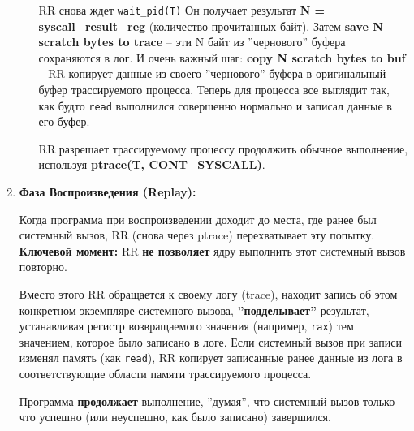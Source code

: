 \begin{enumerate}
\begin{itemize}
      RR снова ждет \texttt{wait\_pid(T)} Он получает результат \textbf{N =
      syscall\_result\_reg} (количество прочитанных байт). Затем \textbf{save N scratch
      bytes to trace} – эти N байт из ''чернового'' буфера сохраняются в лог. И
      очень важный шаг: \textbf{copy N scratch bytes to buf} – RR копирует данные из
      своего ''чернового'' буфера в оригинальный буфер трассируемого процесса.
      Теперь для процесса все выглядит так, как будто \texttt{read} выполнился
      совершенно нормально и записал данные в его буфер.

      RR разрешает трассируемому процессу продолжить обычное выполнение,
      используя \textbf{ptrace(T, CONT\_SYSCALL)}.

    \end{itemize}

  \item \textbf{Фаза Воспроизведения (Replay):}

  Когда программа при воспроизведении доходит до места, где ранее был системный
  вызов, RR (снова через ptrace) перехватывает эту попытку. \textbf{Ключевой
  момент:} RR \textbf{не позволяет} ядру выполнить этот системный вызов
  повторно. 
  
  Вместо этого RR обращается к своему логу (trace), находит запись об этом
  конкретном экземпляре системного вызова, \textbf{''подделывает''} результат,
  устанавливая регистр возвращаемого значения (например, \texttt{rax}) тем
  значением, которое было записано в логе. Если системный вызов при записи
  изменял память (как \texttt{read}), RR копирует записанные ранее данные из лога в
  соответствующие области памяти трассируемого процесса.

  Программа \textbf{продолжает} выполнение, ''думая'', что системный вызов только что
  успешно (или неуспешно, как было записано) завершился.

\end{enumerate}

